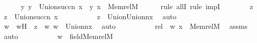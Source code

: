 \begin{isabellebody}
\ \ \ \ \isamarkupfalse%
\ {\isachardoublequoteopen}{\isasymforall}y{\isachardot}{\kern0pt}\ y\ {\isasymin}\ Union{\isacharcircum}{\kern0pt}succ{\isacharparenleft}{\kern0pt}n{\isacharparenright}{\kern0pt}\ {\isacharparenleft}{\kern0pt}x{\isacharparenright}{\kern0pt}\ {\isasymlongrightarrow}\ {\isasymlangle}y{\isacharcomma}{\kern0pt}\ x{\isasymrangle}\ {\isasymin}\ Memrel{\isacharparenleft}{\kern0pt}M{\isacharparenright}{\kern0pt}{\isacharcircum}{\kern0pt}{\isacharplus}{\kern0pt}{\isachardoublequoteclose}\ \isanewline
\ \ \ \ \isamarkupfalse%
{\isacharparenleft}{\kern0pt}rule\ allI{\isacharcomma}{\kern0pt}\ rule\ impI{\isacharparenright}{\kern0pt}\isanewline
\ \ \ \ \ \ \isamarkupfalse%
\ z\ \isamarkupfalse%
\ {\isachardoublequoteopen}z\ {\isasymin}\ Union{\isacharcircum}{\kern0pt}succ{\isacharparenleft}{\kern0pt}n{\isacharparenright}{\kern0pt}\ {\isacharparenleft}{\kern0pt}x{\isacharparenright}{\kern0pt}{\isachardoublequoteclose}\ \isanewline
\ \ \ \ \ \ \isamarkupfalse%
\ \isamarkupfalse%
\ {\isachardoublequoteopen}z\ {\isasymin}\ Union{\isacharparenleft}{\kern0pt}Union{\isacharcircum}{\kern0pt}n{\isacharparenleft}{\kern0pt}x{\isacharparenright}{\kern0pt}{\isacharparenright}{\kern0pt}{\isachardoublequoteclose}\ \isamarkupfalse%
\ auto\ \isanewline
\ \ \ \ \ \ \isamarkupfalse%
\ \isamarkupfalse%
\ w\ \ wH\ {\isacharcolon}{\kern0pt}\ {\isachardoublequoteopen}z\ {\isasymin}\ w{\isachardoublequoteclose}\ {\isachardoublequoteopen}w\ {\isasymin}\ Union{\isacharcircum}{\kern0pt}n{\isacharparenleft}{\kern0pt}x{\isacharparenright}{\kern0pt}{\isachardoublequoteclose}\ \isamarkupfalse%
\ auto\ \isanewline
\ \ \ \ \ \ \isamarkupfalse%
\ \isamarkupfalse%
\ rel\ {\isacharcolon}{\kern0pt}\ {\isachardoublequoteopen}{\isacharless}{\kern0pt}w{\isacharcomma}{\kern0pt}\ x{\isachargreater}{\kern0pt}\ {\isasymin}\ Memrel{\isacharparenleft}{\kern0pt}M{\isacharparenright}{\kern0pt}{\isacharcircum}{\kern0pt}{\isacharplus}{\kern0pt}{\isachardoublequoteclose}\ \isamarkupfalse%
\ assms{}\ \isamarkupfalse%
\ auto\ \isanewline
\ \ \ \ \ \ \isamarkupfalse%
\ \isamarkupfalse%
\ {\isachardoublequoteopen}w\ {\isasymin}\ field{\isacharparenleft}{\kern0pt}Memrel{\isacharparenleft}{\kern0pt}M{\isacharparenright}{\kern0pt}{\isacharcircum}{\kern0pt}{\isacharplus}{\kern0pt}{\isacharparenright}{\kern0pt}{\isachardoublequoteclose}\ \isamarkupfalse%

\end{isabellebody}
